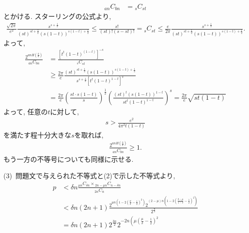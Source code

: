 \begin{ex}
\begin{align*}
        {}_{an} C_{bn}                     & = {}_s C_{st}
    \end{align*}
    とかける.
    スターリングの公式より,
    \begin{align*}
        \frac{\sqrt{2 \pi}}{e^2} \frac{s^{s + \frac{1}{2}}}{(st)^{st + \frac{1}{2}} (s(1-t))^{s(1-t) + \frac{1}{2}}}
        \le
        \frac{s!}{(st)! (s - st)!}={}_s C_{st}
        \le
        \frac{e}{2 \pi} \frac{s^{s + \frac{1}{2}}}{(st)^{st + \frac{1}{2}} (s(1-t))^{s(1-t)+ \frac{1}{2}}}.
    \end{align*}
    よって,
    \begin{align*}
        \frac{2^{an H \left( \frac{b}{a}\right)}}{{}_{an} C_{bn}}
         & =
        \frac{\left[ t^{t} (1-t)^{(1-t)}\right]^{-s}}{{}_s C_{st}}
        \\
         & \ge
        \frac{2 \pi}{e}
        \frac{(st)^{st + \frac{1}{2}} (s(1-t))^{s(1-t)+ \frac{1}{2}}}{s^{s + \frac{1}{2}} \left[ t^{t} (1-t)^{1-t}\right]^s}
        \\
         & =
        \frac{2 \pi}{e}
        \left(
        \frac{st \cdot s(1-t)}{s}
        \right)^{\frac{1}{2}}
        \left(
        \frac{(st)^t (s(1-t))^{1-t}}{s t^t (1-t)^{1-t}}
        \right)^{s}
        =
        \frac{2 \pi}{e}
        \sqrt{st(1-t)}
    \end{align*}
    よって, 任意の$t$に対して,
    \begin{align*}
        s > \frac{e^2}{4 \pi^2 t(1-t)}
    \end{align*}
    を満たす程十分大きな$s$を取れば,
    \begin{align*}
        \frac{2^{an H \left( \frac{b}{a}\right)}}{{}_{an} C_{bn}} \ge 1.
    \end{align*}
    もう一方の不等号についても同様に示せる.
    \par
    (3)\
    問題文で与えられた不等式と(2)で示した不等式より,
    \begin{align*}
        p
         & <
        \delta n
        \frac{{}_{\mu n} C _{\delta n} \times {}_{2n - \mu n} C _{n - \delta n}}{{}_{2n} C_n}
        \\
         & <
        \delta n (2n+1) \frac{
            2^{\mu n \left( 1 - 2 \left(  \frac{\mu}{\delta} - \frac{1}{2}\right)^2\right)}
            2^{(2 - \mu )n \left( 1 - 2 \left(  \frac{2 - \mu}{ 1 - \delta} - \frac{1}{2}\right)^2\right)}
        }
        {
            2^{\frac{n}{2}}
        }
        \\
         & =
        \delta n (2n+1) 2^{\frac{3n}{2}}
        2^{-2 n \left( \mu \left(\frac{\mu}{\delta} - \frac{1}{2}\right)^2
}
\end{align*}
\end{ex}

